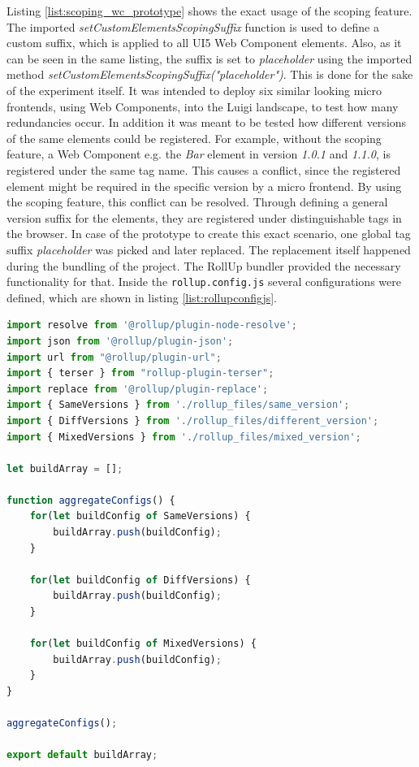 Listing \ref{list:scoping_wc_prototype} shows the exact usage of the scoping feature. 
The imported \textit{setCustomElementsScopingSuffix} function is used to define a custom suffix, which is applied to all UI5 Web Component elements. Also, as it can be seen in the same listing, the suffix is set to \textit{placeholder} using the imported method \textit{setCustomElementsScopingSuffix("placeholder")}.
This is done for the sake of the experiment itself. It was intended to deploy six similar looking micro frontends, using Web Components, into the Luigi landscape, to test how many redundancies occur. In addition it was meant to be tested how different versions of the same elements could be registered. 
For example, without the scoping feature, a Web Component e.g. the \textit{Bar} element in version \textit{1.0.1} and \textit{1.1.0}, is registered under the same tag name. This causes a conflict, since the registered element might be required in the specific version by a micro frontend. By using the scoping feature, this conflict can be resolved.
Through defining a general version suffix for the elements, they are registered under distinguishable tags in the browser.
In case of the prototype to create this exact scenario, one global tag suffix \textit{placeholder} was picked and later replaced. The replacement itself happened during the bundling of the project. The RollUp bundler provided the necessary functionality for that.
Inside the \texttt{rollup.config.js} several configurations were defined, which are shown in listing \ref{list:rollupconfigjs}.
	
\begin{lstlisting}[language=JavaScript, caption=Content of the \texttt{rollup.config.js}, label=list:rollupconfigjs,  xleftmargin=.0\textwidth, xrightmargin=.0\textwidth]
import resolve from '@rollup/plugin-node-resolve';
import json from '@rollup/plugin-json';
import url from "@rollup/plugin-url";
import { terser } from "rollup-plugin-terser";
import replace from '@rollup/plugin-replace';
import { SameVersions } from './rollup_files/same_version';
import { DiffVersions } from './rollup_files/different_version';
import { MixedVersions } from './rollup_files/mixed_version';

let buildArray = [];

function aggregateConfigs() {
	for(let buildConfig of SameVersions) {
		buildArray.push(buildConfig);
	}
	
	for(let buildConfig of DiffVersions) {
		buildArray.push(buildConfig);
	}
	
	for(let buildConfig of MixedVersions) {
		buildArray.push(buildConfig);
	}
}
	
aggregateConfigs();

export default buildArray;
\end{lstlisting}
	
